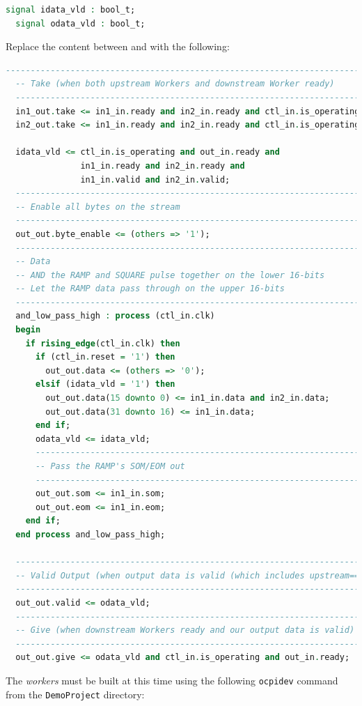\begin{lstlisting}[language=vhdl, columns=fullflexible, breaklines=true, prebreak=\textbackslash, basicstyle=\ttfamily, showstringspaces=false, upquote=true]
  signal idata_vld : bool_t;
  signal odata_vld : bool_t;
\end{lstlisting}
\bend
\pagebreak[1]
Replace the content between  and  with the following:
\begin{lstlisting}[language=vhdl, columns=fullflexible, breaklines=true, prebreak=\textbackslash, basicstyle=\ttfamily, showstringspaces=false, upquote=true]
  -----------------------------------------------------------------------------
  -- Take (when both upstream Workers and downstream Worker ready)
  -----------------------------------------------------------------------------
  in1_out.take <= in1_in.ready and in2_in.ready and ctl_in.is_operating and out_in.ready;
  in2_out.take <= in1_in.ready and in2_in.ready and ctl_in.is_operating and out_in.ready;

  idata_vld <= ctl_in.is_operating and out_in.ready and
               in1_in.ready and in2_in.ready and
               in1_in.valid and in2_in.valid;
  -----------------------------------------------------------------------------
  -- Enable all bytes on the stream
  -----------------------------------------------------------------------------
  out_out.byte_enable <= (others => '1');
  -----------------------------------------------------------------------------
  -- Data
  -- AND the RAMP and SQUARE pulse together on the lower 16-bits
  -- Let the RAMP data pass through on the upper 16-bits
  -----------------------------------------------------------------------------
  and_low_pass_high : process (ctl_in.clk)
  begin
    if rising_edge(ctl_in.clk) then
      if (ctl_in.reset = '1') then
        out_out.data <= (others => '0');
      elsif (idata_vld = '1') then
        out_out.data(15 downto 0) <= in1_in.data and in2_in.data;
        out_out.data(31 downto 16) <= in1_in.data;
      end if;
      odata_vld <= idata_vld;
      -----------------------------------------------------------------------------
      -- Pass the RAMP's SOM/EOM out
      -----------------------------------------------------------------------------
      out_out.som <= in1_in.som;
      out_out.eom <= in1_in.eom;
    end if;
  end process and_low_pass_high;

  -----------------------------------------------------------------------------
  -- Valid Output (when output data is valid (which includes upstream==ready))
  -----------------------------------------------------------------------------
  out_out.valid <= odata_vld;
  -----------------------------------------------------------------------------
  -- Give (when downstream Workers ready and our output data is valid)
  -----------------------------------------------------------------------------
  out_out.give <= odata_vld and ctl_in.is_operating and out_in.ready;
\end{lstlisting}
The \textit{workers} must be built at this time using the following \verb+ocpidev+ command from the \verb+DemoProject+ directory:\\

